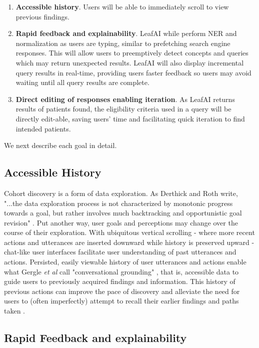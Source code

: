 \documentclass[../main.tex]{subfiles}
\begin{document}
\begin{enumerate}
    \item \textbf{Accessible history}. Users will be able to immediately scroll to view previous findings.
    \item \textbf{Rapid feedback and explainability}. LeafAI while perform NER and normalization as users are typing, similar to prefetching search engine responses. This will allow users to preemptively detect concepts and queries which may return unexpected results. LeafAI will also display incremental query results in real-time, providing users faster feedback so users may avoid waiting until all query results are complete.
    \item \textbf{Direct editing of responses enabling iteration}. As LeafAI returns results of patients found, the eligibility criteria used in a query will be directly edit-able, saving users' time and facilitating quick iteration to find intended patients.
\end{enumerate}

\noindent We next describe each goal in detail.

\subsection{Accessible History} 

Cohort discovery is a form of data exploration. As Derthick and Roth write, "...the data exploration process is not characterized by monotonic progress towards a goal, but rather involves much backtracking and opportunistic goal revision" \cite{derthick2001enhancing}. Put another way, user goals and perceptions may change over the course of their exploration. With ubiquitous vertical scrolling - where more recent actions and utterances are inserted downward while history is preserved upward - chat-like user interfaces facilitate user understanding of past utterances and actions. Persisted, easily viewable history of user utterances and actions enable what Gergle \textit{et al} call "conversational grounding" \cite{gergle2004persistence}, that is, accessible data to guide users to previously acquired findings and information. This history of previous actions can improve the pace of discovery and alleviate the need for users to (often imperfectly) attempt to recall their earlier findings and paths taken \cite{hill1994history, gergle2004persistence}.

\subsection{Rapid Feedback and explainability}
\end{document}
